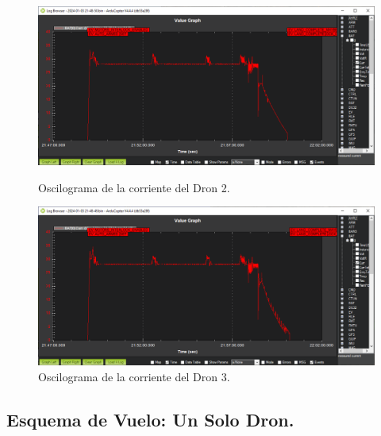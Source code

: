 \newpage

\begin{figure}[h!]
    \includegraphics[width=\linewidth]{imagenes/dron_2.png}
    \caption{Oscilograma de la corriente del Dron 2.}
    \label{fig:subfig2}

    \vspace{1em} %

    \centering
    \includegraphics[width=\linewidth]{imagenes/dron_3.png}
    \caption{Oscilograma de la corriente del Dron 3.}
    \label{fig:enter-label}
\end{figure}

\newpage

\subsection{Esquema de Vuelo: Un Solo Dron.}

